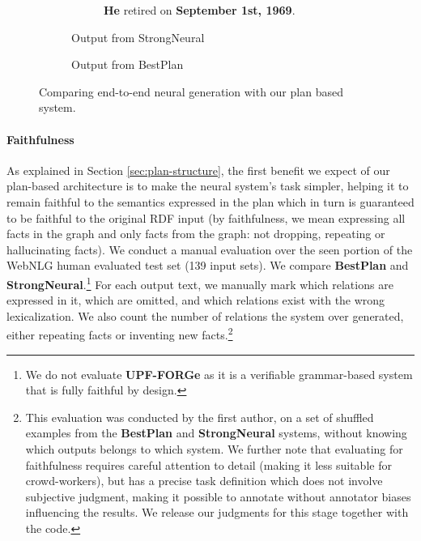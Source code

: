 \documentclass[11pt,a4paper]{article}
\newcommand\ourplans[0]{BestPlan}
\newcommand\ourbaseline[0]{StrongNeural}
\begin{document}
\begin{figure*}[t]
\begin{subfigure}{.9\linewidth}
{\begin{subfigure}{\textwidth}
\begin{footnotesize}
                \textbf{He} retired on \textbf{September 1st, 1969}.
    		\end{footnotesize}
    	\end{subfigure}}
		\caption{Output from \ourbaseline}
		\label{fig:compare-baseline}
	\end{subfigure}
	\begin{subfigure}{.9\linewidth}
	    \vspace{0.3cm}
		\caption{Output from \ourplans}
		\label{fig:compare-plan}
	\end{subfigure}\caption{Comparing end-to-end neural generation with our plan based system.}
	\label{fig:compare}
\end{figure*} 
\paragraph{Faithfulness} 
As explained in Section \ref{sec:plan-structure}, the first benefit we expect of our plan-based architecture is to make the neural system’s task simpler, helping it to remain faithful to the semantics expressed in the plan which in turn is guaranteed to be faithful to the original RDF input (by faithfulness, we mean expressing all facts in the graph and only facts from the graph: not dropping, repeating or hallucinating facts).  We conduct a manual evaluation over the seen portion of the WebNLG human evaluated test set (139 input sets). We compare \textbf{\ourplans} and \textbf{\ourbaseline}.\footnote{We do not evaluate \textbf{UPF-FORGe} as it is a verifiable grammar-based system that is fully faithful by design.} For each output text, we manually mark which relations are expressed in it, which are omitted, and which relations exist with the wrong lexicalization. We also count the number of relations the system over generated, either repeating facts or inventing new facts.\footnote{This evaluation was conducted by the first author, on a set of shuffled examples from the \textbf{\ourplans} and \textbf{\ourbaseline} systems, without knowing which outputs belongs to which system. We further note that evaluating for faithfulness requires careful attention to detail (making it less suitable for crowd-workers), but has a precise task definition which does not involve subjective judgment, making it possible to annotate without annotator biases influencing the results. We release our judgments for this stage together with the code.}
\end{document}
